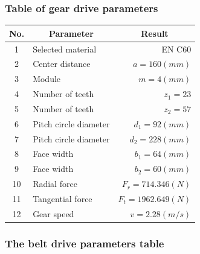 \subsubsection{Table of gear drive parameters}
\begin{table}[h!t]
	\centering
	\renewcommand{\arraystretch}{1.5}
	\begin{tabular}{clr}
		\toprule
		No. & \multicolumn{1}{c}{Parameter} & \multicolumn{1}{c}{Result}\\
		\midrule
		1 & Selected material & EN C60\\
		2 & Center distance & $ a=160\unit{(mm)} $\\
		3 & Module & $ m=4\unit{(mm)} $\\
		4 & Number of teeth & $ z_1 =23 $\\
		5 & Number of teeth & $ z_2 =57 $\\
		6 & Pitch circle diameter & $ d_1=92\unit{(mm)} $\\
		7 & Pitch circle diameter & $ d_2=228\unit{(mm)} $\\
		8 & Face width & $ b_1=64\unit{(mm)} $\\
		9 & Face width & $ b_2=60\unit{(mm)} $\\
		10 & Radial force & $ F_r=714.346\unit{(N)} $\\
		11 & Tangential force & $ F_t=1962.649\unit{(N)} $\\
		12 & Gear speed & $ v=2.28\unit{(m/s)} $\\
		\bottomrule
	\end{tabular}
\end{table}
\newpage\subsubsection{The belt drive parameters table}
